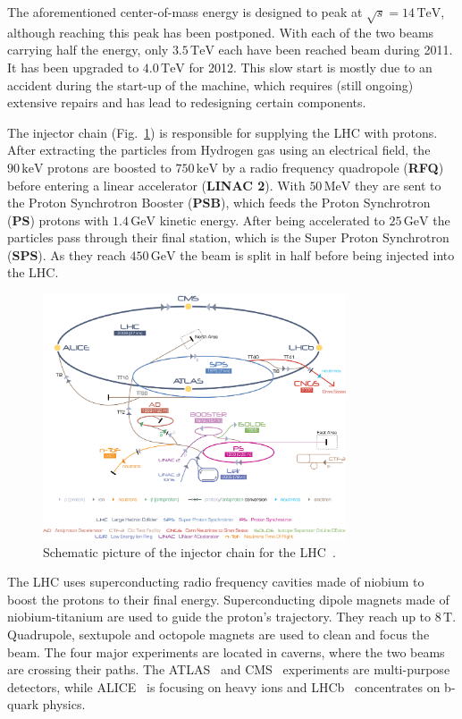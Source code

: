 The aforementioned center-of-mass energy is designed to peak at $\sqrt{s} = 14\,\text{TeV}$, although reaching this peak has been postponed. With each of the two beams carrying half the energy, only $3.5\,\text{TeV}$ each have been reached beam during 2011. It has been upgraded to $4.0\,\text{TeV}$ for 2012. This slow start is mostly due to an accident during the start-up of the machine, which requires (still ongoing) extensive repairs and has lead to redesigning certain components.

The injector chain (Fig.~\ref{fig:injchain}) is responsible for supplying the LHC with protons. After extracting the particles from Hydrogen gas using an electrical field, the $90\,\text{keV}$ protons are boosted to $750\,\text{keV}$ by a radio frequency quadropole (\textbf{RFQ}) before entering a linear accelerator (\textbf{LINAC 2}). With $50\,\text{MeV}$ they are sent to the Proton Synchrotron Booster (\textbf{PSB}), which feeds the Proton Synchrotron (\textbf{PS}) protons with $1.4\,\text{GeV}$ kinetic energy. After being accelerated to $25\,\text{GeV}$ the particles pass through their final station, which is the Super Proton Synchrotron (\textbf{SPS}). As they reach $450\,\text{GeV}$ the beam is split in half before being injected into the LHC.

\begin{figure}[ht!]
  \centering
  \includegraphics[width=0.8\textwidth]{plots/lhcinjectorchain.jpg}
  \caption{Schematic picture of the injector chain for the LHC~\cite{injchain}.}
  \label{fig:injchain}
\end{figure}

The LHC uses superconducting radio frequency cavities made of niobium to boost the protons to their final energy. Superconducting dipole magnets made of niobium-titanium are used to guide the proton's trajectory. They reach up to $8\,\text{T}$. Quadrupole, sextupole and octopole magnets are used to clean and focus the beam. The four major experiments are located in caverns, where the two beams are crossing their paths. The ATLAS~\cite{atlasjinst} and CMS~\cite{cmsjinst} experiments are multi-purpose detectors, while ALICE~\cite{alicejinst} is focusing on heavy ions and LHCb~\cite{lhcbjinst} concentrates on b-quark physics.



